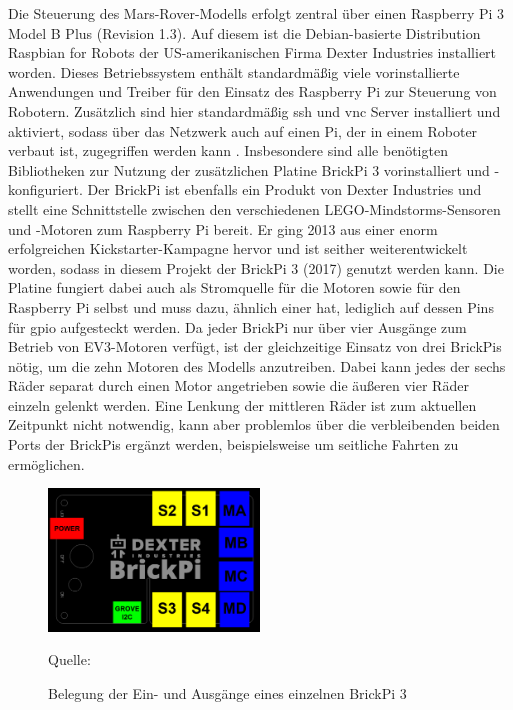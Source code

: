 Die Steuerung des Mars-Rover-Modells erfolgt zentral über einen Raspberry Pi 3 Model B Plus (Revision 1.3).
Auf diesem ist die Debian-basierte Distribution Raspbian for Robots der US-amerikanischen Firma Dexter Industries installiert worden.
Dieses Betriebssystem enthält standardmäßig viele vorinstallierte Anwendungen und Treiber für den Einsatz des Raspberry Pi zur Steuerung von Robotern.
Zusätzlich sind hier standardmäßig \acf{ssh} und \acf{vnc} Server installiert und aktiviert, sodass über das Netzwerk auch auf einen Pi, der in einem Roboter verbaut ist, zugegriffen werden kann \cite{donat2018, mcmanus2017}.
Insbesondere sind alle benötigten Bibliotheken zur Nutzung der zusätzlichen Platine BrickPi 3 vorinstalliert und -konfiguriert.
Der BrickPi ist ebenfalls ein Produkt von Dexter Industries und stellt eine Schnittstelle zwischen den verschiedenen LEGO-Mindstorms-Sensoren und -Motoren zum Raspberry Pi bereit.
Er ging 2013 aus einer enorm erfolgreichen Kickstarter-Kampagne hervor \cite{barnes2015} und ist seither weiterentwickelt worden, sodass in diesem Projekt der BrickPi 3 (2017) genutzt werden kann.
Die Platine fungiert dabei auch als Stromquelle für die Motoren sowie für den Raspberry Pi selbst und muss dazu, ähnlich einer \acf{hat}, lediglich auf dessen Pins für \acf{gpio} aufgesteckt werden.
Da jeder BrickPi nur über vier Ausgänge zum Betrieb von EV3-Motoren verfügt, ist der gleichzeitige Einsatz von drei BrickPis nötig, um die zehn Motoren des Modells anzutreiben.
Dabei kann jedes der sechs Räder separat durch einen Motor angetrieben sowie die äußeren vier Räder einzeln gelenkt werden.
Eine Lenkung der mittleren Räder ist zum aktuellen Zeitpunkt nicht notwendig, kann aber problemlos über die verbleibenden beiden Ports der BrickPis ergänzt werden, beispielsweise um seitliche Fahrten zu ermöglichen.

\begin{figure}
	\centering
	\includegraphics[width=0.5\textwidth]{../Images/BrickPi3-Port-Layout.png}
	\vspace{0.5em}
	\parbox[c]{0.8\linewidth}{\footnotesize
		\centering
		\vspace{1em}
		Quelle: \cite{dexter2017}
	}
	\caption{Belegung der Ein- und Ausgänge eines einzelnen BrickPi 3}
	\label{fig:brickpi3ports}
\end{figure}

